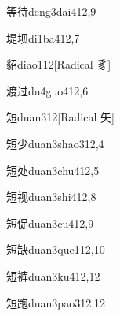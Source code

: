 \begin{verbete}{等待}{deng3dai4}{12,9}
\end{verbete}

\begin{verbete}{堤坝}{di1ba4}{12,7}
\end{verbete}

\begin{verbete}{貂}{diao1}{12}[Radical 豸]
\end{verbete}

\begin{verbete}{渡过}{du4guo4}{12,6}
\end{verbete}

\begin{verbete}{短}{duan3}{12}[Radical ⽮]
\end{verbete}

\begin{verbete}{短少}{duan3shao3}{12,4}
\end{verbete}

\begin{verbete}{短处}{duan3chu4}{12,5}
\end{verbete}

\begin{verbete}{短视}{duan3shi4}{12,8}
\end{verbete}

\begin{verbete}{短促}{duan3cu4}{12,9}
\end{verbete}

\begin{verbete}{短缺}{duan3que1}{12,10}
\end{verbete}

\begin{verbete}{短裤}{duan3ku4}{12,12}
\end{verbete}

\begin{verbete}{短跑}{duan3pao3}{12,12}
\end{verbete}

